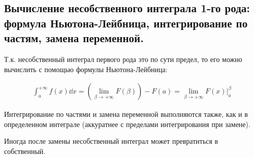 \subsection{%
  Вычисление несобственного интеграла 1-го рода: формула Ньютона-Лейбница,
  интегрирование по частям, замена переменной.%
}

Т.к. несобственный интеграл первого рода это по сути предел, то его можно
вычислить с помощью формулы Ньютона-Лейбница:

\begin{align*}
  \int_{a}^{+\infty} f(x) \dd x
  = \left( \lim_{\beta \to +\infty} F(\beta) \right) - F(a)
  = \lim_{\beta \to +\infty} F(x) \bigg\vert_{a}^{\beta}
\end{align*}

Интегрирование по частями и замена переменной выполняются также, как и в
определенном интеграле (аккуратнее с пределами интегрирования при замене).

\begin{remark}
  Иногда после замены несобственный интеграл может превратиться в собственный.
\end{remark}
